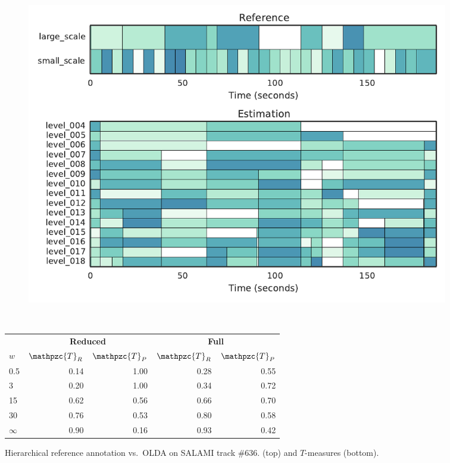 \documentclass{article}
\def\shag{\ensuremath{\mathpzc{T}}}
\begin{document}
\begin{figure}[t]
  \centering
  \begin{subfigure}{\columnwidth}
    \centering
   \includegraphics[width=\columnwidth]{figs/SALAMI-OLDA}
  \end{subfigure}%
  \\
  \vspace{-\baselineskip}
  \begin{minipage}{\columnwidth}
    \small
    \centering
    \vspace{10pt}
    \begin{tabular}{lrrrr}
      \toprule
      & \multicolumn{2}{c}{\textbf{Reduced}} & \multicolumn{2}{c}{\textbf{Full}} \\
      $w$       & $\shag_R$    & $\shag_P$  & $\shag_R$ & $\shag_P$    \\
      \midrule
      0.5       & 0.14       & 1.00  & 0.28 & 0.55 \\
      3         & 0.20       & 1.00  & 0.34 & 0.72    \\
      15        & 0.62       & 0.56  & 0.66 & 0.70 \\
      30        & 0.76       & 0.53  & 0.80 & 0.58  \\
      $\infty$  & 0.90       & 0.16  & 0.93 & 0.42\\
      \bottomrule
  \end{tabular}
  \end{minipage}
  \caption{Hierarchical reference annotation vs.\ OLDA on SALAMI track \#636.
  (top) and $T$-measures (bottom).}\label{fig:SALAMI-OLDA}
\end{figure}
\end{document}
